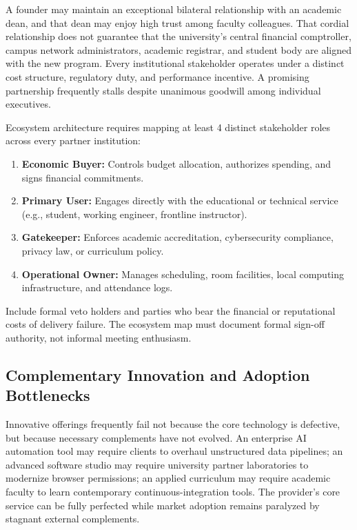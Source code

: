 A founder may maintain an exceptional bilateral relationship with an academic dean, and that dean may enjoy high trust among faculty colleagues. That cordial relationship does not guarantee that the university's central financial comptroller, campus network administrators, academic registrar, and student body are aligned with the new program. Every institutional stakeholder operates under a distinct cost structure, regulatory duty, and performance incentive. A promising partnership frequently stalls despite unanimous goodwill among individual executives.

Ecosystem architecture requires mapping at least 4 distinct stakeholder roles across every partner institution:
\begin{enumerate}
\item \textbf{Economic Buyer:} Controls budget allocation, authorizes spending, and signs financial commitments.
\item \textbf{Primary User:} Engages directly with the educational or technical service (e.g., student, working engineer, frontline instructor).
\item \textbf{Gatekeeper:} Enforces academic accreditation, cybersecurity compliance, privacy law, or curriculum policy.
\item \textbf{Operational Owner:} Manages scheduling, room facilities, local computing infrastructure, and attendance logs.
\end{enumerate}
Include formal veto holders and parties who bear the financial or reputational costs of delivery failure. The ecosystem map must document formal sign-off authority, not informal meeting enthusiasm.

\subsection{Complementary Innovation and Adoption Bottlenecks}
\label{sec:complementary_innovation_adoption_bottlenecks}

Innovative offerings frequently fail not because the core technology is defective, but because necessary complements have not evolved. An enterprise AI automation tool may require clients to overhaul unstructured data pipelines; an advanced software studio may require university partner laboratories to modernize browser permissions; an applied curriculum may require academic faculty to learn contemporary continuous-integration tools. The provider's core service can be fully perfected while market adoption remains paralyzed by stagnant external complements.

